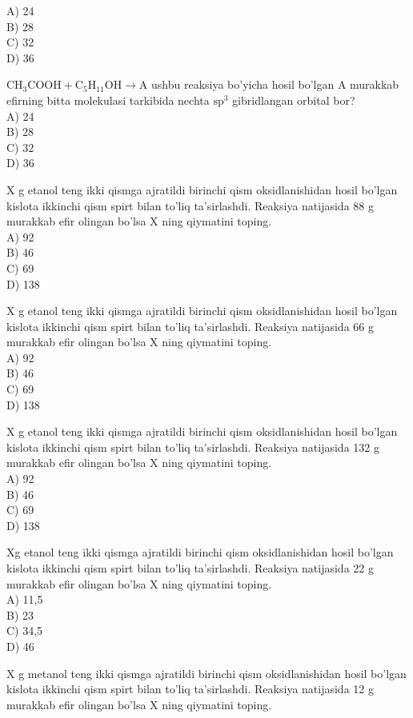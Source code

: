 A) 24\\
B) 28\\
C) 32\\
D) 36
  \item $\mathrm{CH}_{3} \mathrm{COOH}+\mathrm{C}_{5} \mathrm{H}_{11} \mathrm{OH} \rightarrow \mathrm{A}$ ushbu reaksiya bo'yicha hosil bo'lgan A murakkab efirning bitta molekulasi tarkibida nechta $\mathrm{sp}^{3}$ gibridlangan orbital bor?\\
A) 24\\
B) 28\\
C) 32\\
D) 36
  \item X g etanol teng ikki qismga ajratildi birinchi qism oksidlanishidan hosil bo'lgan kislota ikkinchi qism spirt bilan to'liq ta'sirlashdi. Reaksiya natijasida 88 g murakkab efir olingan bo'lsa X ning qiymatini toping.\\
A) 92\\
B) 46\\
C) 69\\
D) 138
  \item X g etanol teng ikki qismga ajratildi birinchi qism oksidlanishidan hosil bo'lgan kislota ikkinchi qism spirt bilan to'liq ta'sirlashdi. Reaksiya natijasida 66 g murakkab efir olingan bo'lsa X ning qiymatini toping.\\
A) 92\\
B) 46\\
C) 69\\
D) 138
  \item X g etanol teng ikki qismga ajratildi birinchi qism oksidlanishidan hosil bo'lgan kislota ikkinchi qism spirt bilan to'liq ta'sirlashdi. Reaksiya natijasida 132 g murakkab efir olingan bo'lsa X ning qiymatini toping.\\
A) 92\\
B) 46\\
C) 69\\
D) 138
  \item Xg etanol teng ikki qismga ajratildi birinchi qism oksidlanishidan hosil bo'lgan kislota ikkinchi qism spirt bilan to'liq ta'sirlashdi. Reaksiya natijasida 22 g murakkab efir olingan bo'lsa X ning qiymatini toping.\\
A) 11,5\\
B) 23\\
C) 34,5\\
D) 46
  \item X g metanol teng ikki qismga ajratildi birinchi qism oksidlanishidan hosil bo'lgan kislota ikkinchi qism spirt bilan to'liq ta'sirlashdi. Reaksiya natijasida 12 g murakkab efir olingan bo'lsa X ning qiymatini toping.\\
